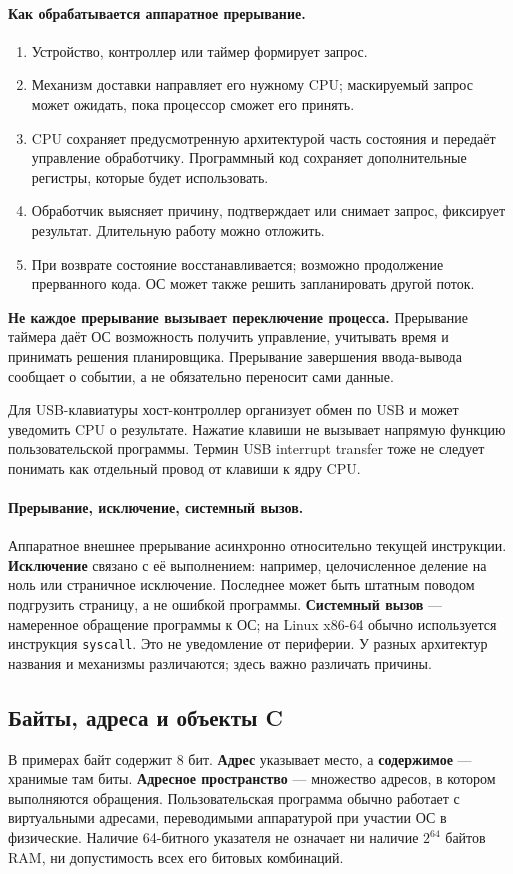 \paragraph{Как обрабатывается аппаратное прерывание.}
\begin{enumerate}
\item Устройство, контроллер или таймер формирует запрос.
\item Механизм доставки направляет его нужному CPU; маскируемый запрос
      может ожидать, пока процессор сможет его принять.
\item CPU сохраняет предусмотренную архитектурой часть состояния и
      передаёт управление обработчику. Программный код сохраняет
      дополнительные регистры, которые будет использовать.
\item Обработчик выясняет причину, подтверждает или снимает запрос,
      фиксирует результат. Длительную работу можно отложить.
\item При возврате состояние восстанавливается; возможно продолжение
      прерванного кода. ОС может также решить запланировать другой поток.
\end{enumerate}
\textbf{Не каждое прерывание вызывает переключение процесса.} Прерывание
таймера даёт ОС возможность получить управление, учитывать время и принимать
решения планировщика. Прерывание завершения ввода-вывода сообщает о событии,
а не обязательно переносит сами данные.

Для USB-клавиатуры хост-контроллер организует обмен по USB и может уведомить
CPU о результате. Нажатие клавиши не вызывает напрямую функцию
пользовательской программы. Термин USB interrupt transfer тоже не следует
понимать как отдельный провод от клавиши к ядру CPU.

\paragraph{Прерывание, исключение, системный вызов.}
Аппаратное внешнее прерывание асинхронно относительно текущей инструкции.
\textbf{Исключение} связано с её выполнением: например, целочисленное деление
на ноль или страничное исключение. Последнее может быть штатным поводом
подгрузить страницу, а не ошибкой программы. \textbf{Системный вызов} ---
намеренное обращение программы к ОС; на Linux x86-64 обычно используется
инструкция \texttt{syscall}. Это не уведомление от периферии. У разных
архитектур названия и механизмы различаются; здесь важно различать причины.

\subsection{Байты, адреса и объекты C}
В примерах байт содержит 8 бит. \textbf{Адрес} указывает место, а
\textbf{содержимое} --- хранимые там биты. \textbf{Адресное пространство}
--- множество адресов, в котором выполняются обращения. Пользовательская
программа обычно работает с виртуальными адресами, переводимыми аппаратурой
при участии ОС в физические. Наличие 64-битного указателя не означает ни
наличие $2^{64}$ байтов RAM, ни допустимость всех его битовых комбинаций.

